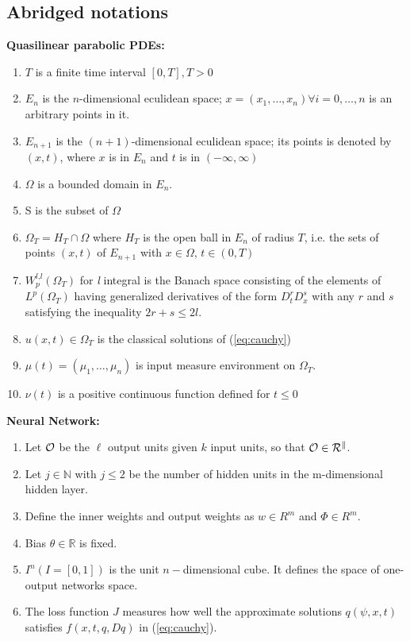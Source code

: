 \documentclass{article}
\begin{document}
	\subsection{Abridged notations}
	\textbf{Quasilinear parabolic PDEs:}
	\begin{enumerate}
			\item $T$ is a finite time interval $[0,T], T>0$
		\item $E_{n}$ is the $n$-dimensional eculidean space; $x = (x_1, \dots , x_n) \forall i = 0, \dots, n$ is an arbitrary points in it.
		\item $E_{n+1}$ is the $(n+1)$-dimensional eculidean space;
		its points is denoted by $(x,t)$, where $x$ is in $E_{n}$ and $t$ is in $(- \infty, \infty)$
		\item $\Omega$ is a bounded domain in $E_{n}$.
		\item S is the subset of $\Omega$
		\item $\Omega_{T} = H_{T} \cap \Omega$ where $H_{T}$ is the open ball in $E_{n}$ of radius $T$, i.e. the sets of points $(x,t)$ of $E_{n+1}$ with $x \in \Omega$, $t \in (0,T)$
		\item $W^{\textit{l},\textit{l}}_{p}(\Omega_{T})$ for \textit{l} integral is the Banach space consisting of the elements of $L^{p}(\Omega_{T})$ having generalized derivatives of the form $D^{r}_{t}D^{s}_{x}$ with any $r$ and $s$ satisfying the inequality $2r+s \leq 2\textit{l}$.
		\item $u(x,t) \in \Omega_{T}$ is the classical solutions of (\ref{eq:cauchy})
		\item $\mu(t)=(\mu_1, \dots, \mu_{n})$ is input measure environment on $\Omega_{T}$.
		\item $\nu(t)$ is a positive continuous function defined for $t \leq 0$
	\end{enumerate}
	\textbf{Neural Network:}
	\begin{enumerate}
		\item Let $\cal{O}$ be the $\ell$ output units given $k$ input units, so that $\cal{O} \in R^{k}$.
		\item Let $j \in \mathbb{N}$ with $j \leq 2$ be the number of hidden units in the m-dimensional hidden layer.
		\item Define the inner weights and output weights as $w \in R^m$ and $\Phi \in R^m$.
		\item Bias $\theta \in \mathbb{R}$ is fixed.
		\item $I^{n}(I=[0,1])$ is the unit $n-$dimensional cube. It defines the space of one-output networks space.
		\item The loss function $J$ measures how well the approximate solutions $q(\psi,x,t)$ satisfies $f(x,t,q,Dq)$ in (\ref{eq:cauchy}).
\end{enumerate}
\end{document}
